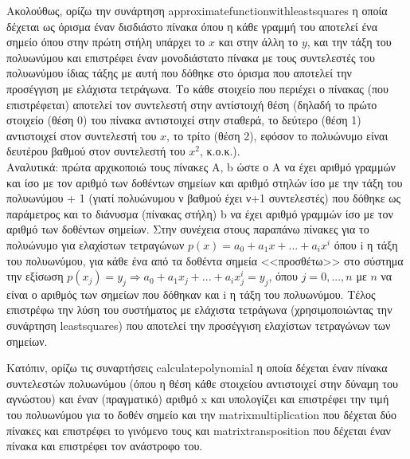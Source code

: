 \documentclass[a4paper,11pt]{article}
\newcommand{\lt}{\latintext}
\begin{document}
\par
Ακολούθως, ορίζω την συνάρτηση {\lt approximate\textunderscore function\textunderscore with\textunderscore least\textunderscore squares} η οποία δέχεται ως όρισμα έναν δισδιάστο πίνακα όπου η κάθε γραμμή του αποτελεί ένα σημείο όπου στην πρώτη στήλη υπάρχει το {\lt $x$} και στην άλλη το {\lt $y$}, και την τάξη του πολυωνύμου και επιστρέφει έναν μονοδιάστατο πίνακα με τους συντελεστές του πολυωνύμου ίδιας τάξης με αυτή που δόθηκε στο όρισμα που αποτελεί την προσέγγιση με ελάχιστα τετράγωνα. Το κάθε στοιχείο που περιέχει ο πίνακας (που επιστρέφεται) αποτελεί τον συντελεστή στην αντίστοιχή θέση (δηλαδή το πρώτο στοιχείο (θέση 0) του πίνακα αντιστοιχεί στην σταθερά, το δεύτερο (θέση 1) αντιστοιχεί στον συντελεστή του {\lt $x$}, το τρίτο (θέση 2), εφόσον το πολυώνυμο είναι δευτέρου βαθμού στον συντελεστή του {\lt $x^2$}, κ.ο.κ.).\\
Αναλυτικά: πρώτα αρχικοποιώ τους πίνακες {\lt A, b} ώστε ο {\lt A} να έχει αριθμό γραμμών και ίσο με τον αριθμό των δοθέντων σημείων και αριθμό στηλών ίσο με την τάξη του πολυωνύμου + 1 (γιατί πολυώνυμου ν βαθμού έχει ν+1 συντελεστές) που δόθηκε ως παράμετρος και το διάνυσμα (πίνακας στήλη) {\lt b} να έχει αριθμό γραμμών ίσο με τον αριθμό των δοθέντων σημείων. Στην συνέχεια στους παραπάνω πίνακες για το πολυώνυμο για ελαχίστων τετραγώνων {\lt $p(x) = a_0 + a_1x + ... + a_ix^i$} όπου {\lt i} η τάξη του πολυωνύμου, για κάθε ένα από τα δοθέντα σημεία <<προσθέτω>> στο σύστημα την εξίσωση {\lt $p(x_j) = y_j \Longrightarrow a_0 + a_1x_j + ... + a_ix_j^i = y_j $}, όπου {\lt $j = 0, ..., n$} με {\lt $n$} να είναι ο αριθμός των σημείων που δόθηκαν και {\lt i} η τάξη του πολυωνύμου. Τέλος επιστρέφω την λύση του συστήματος με ελάχιστα τετράγωνα (χρησιμοποιώντας την συνάρτηση {\lt least\textunderscore squares}) που αποτελεί την προσέγγιση ελαχίστων τετραγώνων των σημείων.\\


\par
Κατόπιν, ορίζω τις συναρτήσεις {\lt calculate\textunderscore polynomial} η οποία δέχεται έναν πίνακα συντελεστών πολυωνύμου (όπου η θέση κάθε στοιχείου αντιστοιχεί στην δύναμη του αγνώστου) και έναν (πραγματικό) αριθμό {\lt x} και υπολογίζει και επιστρέφει την τιμή του πολυωνύμου για το δοθέν σημείο και την {\lt matrix\textunderscore multiplication} που δέχεται δύο πίνακες και επιστρέφει το γινόμενο τους και {\lt matrix\textunderscore transposition} που δέχεται έναν πίνακα και επιστρέφει τον ανάστροφο του.\\
\end{document}
